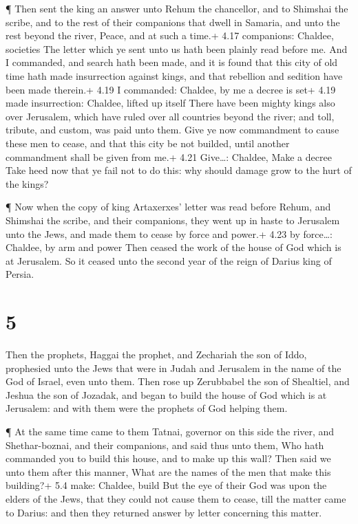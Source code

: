  ¶ Then sent the king an answer unto Rehum the chancellor,
and to Shimshai the scribe, and to the rest of their companions that
dwell in Samaria, and unto the rest beyond the river, Peace, and at such
a time.+ 4.17 companions: Chaldee, societies  The letter
which ye sent unto us hath been plainly read before me. 
And I commanded, and search hath been made, and it is found that this
city of old time hath made insurrection against kings, and that
rebellion and sedition have been made therein.+ 4.19 I commanded:
Chaldee, by me a decree is set+ 4.19 made insurrection: Chaldee, lifted
up itself  There have been mighty kings also over
Jerusalem, which have ruled over all countries beyond the river; and
toll, tribute, and custom, was paid unto them.  Give ye now
commandment to cause these men to cease, and that this city be not
builded, until another commandment shall be given from me.+ 4.21
Give\ldots: Chaldee, Make a decree  Take heed now that ye
fail not to do this: why should damage grow to the hurt of the kings?

 ¶ Now when the copy of king Artaxerxes' letter was read
before Rehum, and Shimshai the scribe, and their companions, they went
up in haste to Jerusalem unto the Jews, and made them to cease by force
and power.+ 4.23 by force\ldots: Chaldee, by arm and power 
Then ceased the work of the house of God which is at Jerusalem. So it
ceased unto the second year of the reign of Darius king of Persia.

\hypertarget{section-4}{%
\section{5}\label{section-4}}

 Then the prophets, Haggai the prophet, and Zechariah the
son of Iddo, prophesied unto the Jews that were in Judah and Jerusalem
in the name of the God of Israel, even unto them.  Then rose
up Zerubbabel the son of Shealtiel, and Jeshua the son of Jozadak, and
began to build the house of God which is at Jerusalem: and with them
were the prophets of God helping them.

 ¶ At the same time came to them Tatnai, governor on this
side the river, and Shethar-boznai, and their companions, and said thus
unto them, Who hath commanded you to build this house, and to make up
this wall?  Then said we unto them after this manner, What
are the names of the men that make this building?+ 5.4 make: Chaldee,
build  But the eye of their God was upon the elders of the
Jews, that they could not cause them to cease, till the matter came to
Darius: and then they returned answer by letter concerning this matter.

